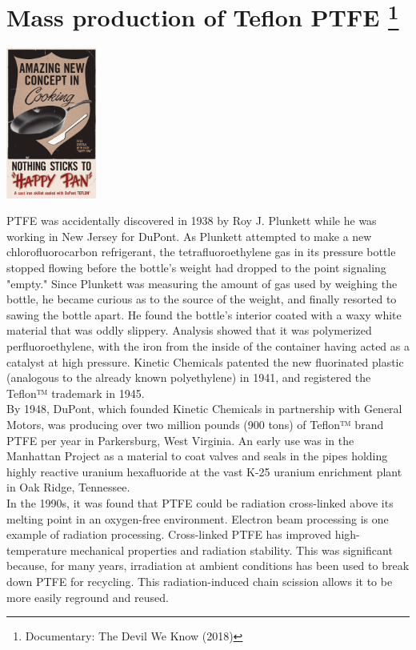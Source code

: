 \documentclass[11pt]{report}
\begin{document}
\section{Mass production of Teflon PTFE \protect\footnote{Documentary: The Devil We Know (2018)}}
\vspace{2mm}\begin{center}\includegraphics[width=3cm]{./img/teflonPan.jpg}\end{center}
PTFE was accidentally discovered in 1938 by Roy J. Plunkett while he was working in New Jersey for DuPont. As Plunkett attempted to make a new chlorofluorocarbon refrigerant, the tetrafluoroethylene gas in its pressure bottle stopped flowing before the bottle's weight had dropped to the point signaling "empty." Since Plunkett was measuring the amount of gas used by weighing the bottle, he became curious as to the source of the weight, and finally resorted to sawing the bottle apart. He found the bottle's interior coated with a waxy white material that was oddly slippery. Analysis showed that it was polymerized perfluoroethylene, with the iron from the inside of the container having acted as a catalyst at high pressure. Kinetic Chemicals patented the new fluorinated plastic (analogous to the already known polyethylene) in 1941, and registered the Teflon™ trademark in 1945.\\
\indent By 1948, DuPont, which founded Kinetic Chemicals in partnership with General Motors, was producing over two million pounds (900 tons) of Teflon™ brand PTFE per year in Parkersburg, West Virginia. An early use was in the Manhattan Project as a material to coat valves and seals in the pipes holding highly reactive uranium hexafluoride at the vast K-25 uranium enrichment plant in Oak Ridge, Tennessee.\\ \indent In the 1990s, it was found that PTFE could be radiation cross-linked above its melting point in an oxygen-free environment. Electron beam processing is one example of radiation processing. Cross-linked PTFE has improved high-temperature mechanical properties and radiation stability. This was significant because, for many years, irradiation at ambient conditions has been used to break down PTFE for recycling. This radiation-induced chain scission allows it to be more easily reground and reused.
\end{document}
